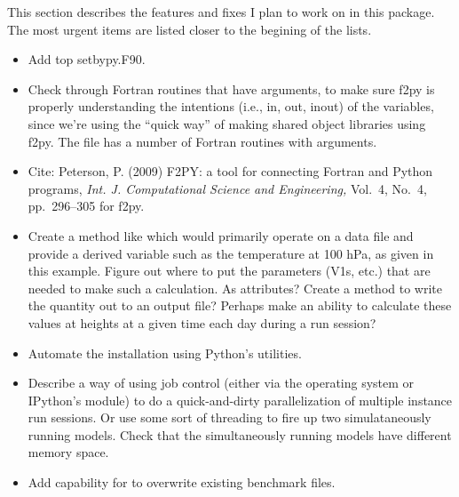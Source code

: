 %


%
This section describes the features and fixes I plan to work on
in this package.  The most urgent items are listed closer to the
begining of the lists.

\begin{itemize}
\item Add  top setbypy.F90.

\item Check through Fortran routines that have arguments, to make sure
	f2py is properly understanding the intentions
	(i.e., in, out, inout) of the variables, since we're using the
	``quick way'' of making shared object libraries using f2py.
	The  file has a number of Fortran routines
	with arguments.

\item Cite:  Peterson, P. (2009) 
	F2PY: a tool for connecting Fortran and Python programs, 
	\emph{Int. J. Computational Science and Engineering,}
	Vol.\ 4, No.\ 4, pp.\ 296--305 for f2py.

\item Create a method like  which would
	primarily operate on a data file and provide a derived variable
	such as the temperature at 100 hPa, as given in this example.
	Figure out where to put the parameters (V1s, etc.) that are
	needed to make such a calculation.  As attributes?  Create a
	method to write the quantity out to an output file?
	Perhaps make an ability to calculate these values at heights
	at a given time each day during a run session?

\item Automate the installation using Python's
	utilities.

\item Describe a way of using job control (either via the operating system
	or IPython's  module) 
	to do a quick-and-dirty parallelization of multiple
	 instance run sessions.  Or use some sort of threading
	to fire up two simulataneously running models.  Check that the
	simultaneously running models have different memory space.

\item Add capability for  to overwrite
	existing benchmark files.


\end{itemize}
